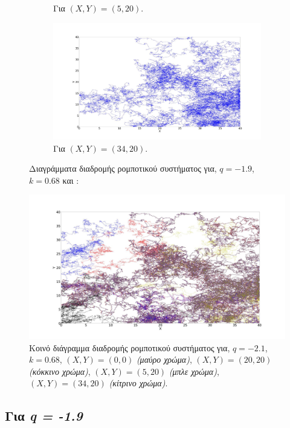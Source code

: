 \begin{figure}[ht]
\begin{subfigure}[b]{0.55\textwidth}
		\caption{Για $(X,Y) = (5,20)$.}
		\label{f:g86}
	\end{subfigure}
	\hfill
	\begin{subfigure}[b]{0.55\textwidth}
		\centering
		\includegraphics[width=\textwidth]{LateX images/log/XY1/g5-2.1}
		\caption{Για $(X,Y) = (34,20)$.}
		\label{f:g87}
	\end{subfigure}
	\hfill
\caption{Διαγράμματα διαδρομής ρομποτικού συστήματος για, $q = -1.9$, $k = 0.68$ και :}
\end{figure}

\begin{figure}[ht]
	\centering
	\includegraphics[width=1\linewidth]{LateX images/log/XY1/g2}
	\caption{Κοινό διάγραμμα διαδρομής ρομποτικού συστήματος για, $q = -2.1$, $k = 0.68$, $(X,Y) = (0,0)$ \emph{(μαύρο χρώμα)}, $(X,Y) = (20,20)$ \emph{(κόκκινο χρώμα)}, $(X,Y) = (5,20)$ \emph{(μπλε χρώμα)}, $(X,Y) = (34,20)$ \emph{(κίτρινο χρώμα)}.}
		\label{f:g93}	
	\end{figure}


\clearpage

\subsection{Για \emph{q = -1.9}}

